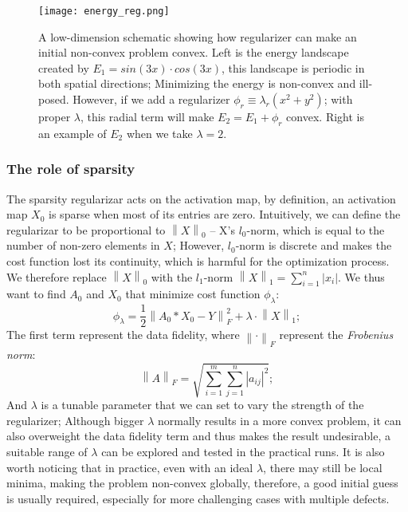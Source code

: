 \begin{figure}
	\texttt{[image: energy\_reg.png]} 
	\centering
	\caption{A low-dimension schematic showing how regularizer can make an initial non-convex problem convex. Left is the energy landscape created by $E_1 = sin(3x)\cdot cos(3x)$, this landscape is periodic in both spatial directions; Minimizing the energy is non-convex and ill-posed. However, if we add a regularizer $\phi_r \equiv \lambda_r(x^2 + y^2)$; with proper $\lambda$, this radial term will make $E_2 = E_1 + \phi_r$ convex. Right is an example of $E_2$ when we take $\lambda=2$.}
	\label{fig:ch6_reg}
\end{figure}

\subsubsection{The role of sparsity}
The sparsity regularizar acts on the activation map, by definition, an activation map $X_0$ is sparse when most of its entries are zero. Intuitively, we can define the regularizar to be proportional to $\left\lVert X\right\rVert_0$ -- X's $l_0$-norm, which is equal to the number of non-zero elements in $X$; However, $l_0$-norm is discrete and makes the cost function lost its continuity, which is harmful for the optimization process. We therefore replace $\left\lVert X\right\rVert_0$ with the $l_1$-norm $\left\lVert X\right\rVert_1 = \sum_{i=1}^{n}\vert x_i \vert$. We thus want to find $A_0$ and $X_0$ that minimize cost function $\phi_{\lambda}$:
\begin{equation}
	\phi_{\lambda} = \frac{1}{2}\left\lVert A_0 * X_0 - Y \right\rVert^2_F + \lambda \cdot \left\lVert X\right\rVert_1;
\end{equation}
\noindent The first term represent the data fidelity, where $\left\lVert \cdot\right\rVert_F$ represent the \textit{Frobenius norm}: 
\[
\left\lVert A \right\rVert_F = \sqrt{ \sum_{i=1}^{m} \sum_{j=1}^{n} |a_{ij}|^2 };
\] 
\noindent And $\lambda$ is a tunable parameter that we can set to vary the strength of the regularizer; Although bigger $\lambda$ normally results in a more convex problem, it can also overweight the data fidelity term and thus makes the result undesirable, a suitable range of $\lambda$ can be explored and tested in the practical runs. It is also worth noticing that in practice, even with an ideal $\lambda$, there may still be local minima, making the problem non-convex globally, therefore, a good initial guess is usually required, especially for more challenging cases with multiple defects. 

